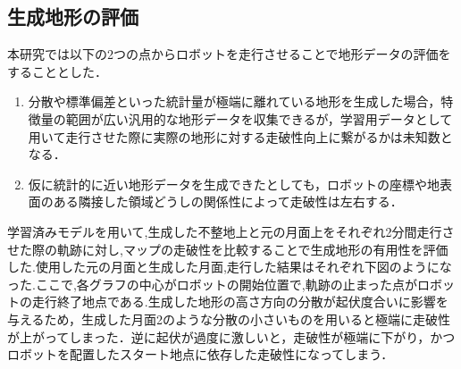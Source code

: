 \documentclass[uplatex,twocolumn, dvipdfmx]{jsarticle}  %
\begin{document}
\subsection{生成地形の評価}
本研究では以下の2つの点からロボットを走行させることで地形データの評価をすることとした．
\begin{enumerate}
  \item 分散や標準偏差といった統計量が極端に離れている地形を生成した場合，特徴量の範囲が広い汎用的な地形データを収集できるが，学習用データとして用いて走行させた際に実際の地形に対する走破性向上に繋がるかは未知数となる．
  \item 仮に統計的に近い地形データを生成できたとしても，ロボットの座標や地表面のある隣接した領域どうしの関係性によって走破性は左右する．
\end{enumerate}
学習済みモデルを用いて,生成した不整地上と元の月面上をそれぞれ2分間走行させた際の軌跡に対し,マップの走破性を比較することで生成地形の有用性を評価した.使用した元の月面と生成した月面,走行した結果はそれぞれ下図のようになった.ここで,各グラフの中心がロボットの開始位置で,軌跡の止まった点がロボットの走行終了地点である.生成した地形の高さ方向の分散が起伏度合いに影響を与えるため，生成した月面2のような分散の小さいものを用いると極端に走破性が上がってしまった．逆に起伏が過度に激しいと，走破性が極端に下がり，かつロボットを配置したスタート地点に依存した走破性になってしまう．
\end{document}
